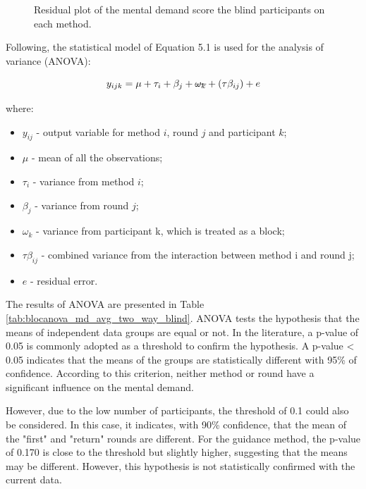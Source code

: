 \begin{figure}[!htb]
\begin{minipage}{0.45\textwidth}
        \caption{Residual plot of the mental demand score the blind participants on each method.}
        \label{fig:residplot_md_avg_two_way_blind}
    \end{minipage}
\end{figure}

Following, the statistical model of Equation 5.1 is used for the analysis of variance (ANOVA): 

\begin{equation}
    \label{eq:statistical_model}
    y_{ijk} = \mu + \tau_i + \beta_j + \msout{\omega_k} + (\tau\beta_{ij}) + e
\end{equation}

where:

\begin{itemize}
    \item $y_{ij}$ - output variable for method $i$, round $j$ and participant $k$;
    \item $\mu$ - mean of all the observations;
    \item $\tau_i$ - variance from method $i$;
    \item $\beta_j$ - variance from round $j$;
    \item \sout{$\omega_k$} - variance from participant k, which is treated as a block;
    \item $\tau\beta_{ij}$ - combined variance from the interaction between method i and round j;
    \item $e$ - residual error.
\end{itemize}

The results of ANOVA are presented in Table \ref{tab:blocanova_md_avg_two_way_blind}. ANOVA tests the hypothesis that the means of independent data groups are equal or not. In the literature, a p-value of 0.05 is commonly adopted as a threshold to confirm the hypothesis. A p-value < 0.05 indicates that the means of the groups are statistically different with 95\% of confidence. According to this criterion, neither method or round have a significant influence on the mental demand.

However, due to the low number of participants, the threshold of 0.1 could also be considered. In this case, it indicates, with 90\% confidence, that the mean of the "first" and "return" rounds are different. For the guidance method, the p-value of 0.170 is close to the threshold but slightly higher, suggesting that the means may be different. However, this hypothesis is not statistically confirmed with the current data. 

